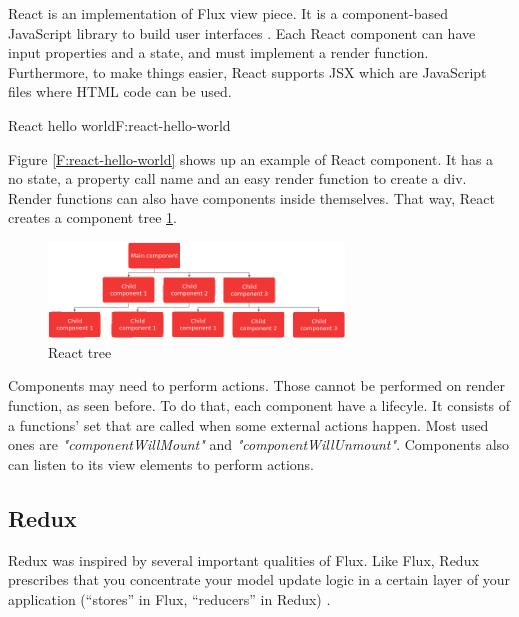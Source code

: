 React is an implementation of Flux view piece. It is a component-based 
JavaScript library to build user interfaces \cite{react-web}. Each React
component can have input properties and a state, and must implement a render
function. Furthermore, to make things easier, React supports JSX which are
JavaScript files where HTML code can be used.


\begin{codefigure}{React hello world}{F:react-hello-world}
\end{codefigure}

Figure \ref{F:react-hello-world} shows up an example of React component. It has
a no state, a property call name and an easy render function to create a div.
Render functions can also have components inside themselves. That way, React
creates a component tree \ref{F:react-tree}.

\begin{figure}[htb]
	\begin{center}
		\includegraphics[width=0.7\textwidth]{./figures/react-tree.png}
		\caption{React tree}
		\label{F:react-tree}
	\end{center}
\end{figure}

Components may need to perform actions. Those cannot be performed on render 
function, as seen before. To do that, each component have a lifecyle. It 
consists of a functions' set that are called when some external actions happen. 
Most used ones are \textit{"componentWillMount"} and 
\textit{"componentWillUnmount"}. Components also can listen to its view
elements to perform actions.

\subsection{Redux}

Redux was inspired by several important qualities of Flux. Like Flux, Redux
prescribes that you concentrate your model update logic in a certain layer of
your application (“stores” in Flux, “reducers” in Redux) \cite{redux-prior-art}.


